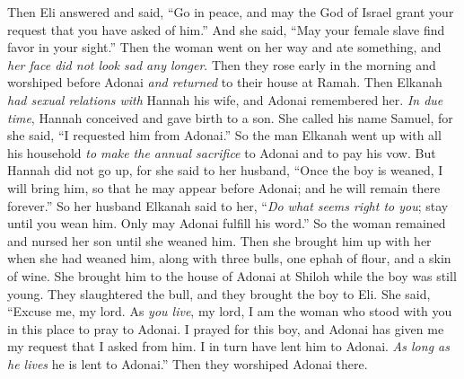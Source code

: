 \begin{biblechapter}
\verse Then Eli answered and said, “Go in peace, and may the God of Israel grant your request that you have asked of him.”
\verse And she said, “May your female slave find favor in your sight.” Then the woman went on her way and ate something, and \textit{her face did not look sad any longer}.
 Then they rose early in the morning and worshiped before Adonai \textit{and returned} to their house at Ramah. Then Elkanah \textit{had sexual relations with} Hannah his wife, and Adonai remembered her.
\verse \textit{In due time}, Hannah conceived and gave birth to a son. She called his name Samuel, for she said, “I requested him from Adonai.”
\verse So the man Elkanah went up with all his household \textit{to make the annual sacrifice} to Adonai and to pay his vow.
\verse But Hannah did not go up, for she said to her husband, “Once the boy is weaned, I will bring him, so that he may appear before Adonai; and he will remain there forever.”
\verse So her husband Elkanah said to her, “\textit{Do what seems right to you}; stay until you wean him. Only may Adonai fulfill his word.” So the woman remained and nursed her son until she weaned him.
\verse Then she brought him up with her when she had weaned him, along with three bulls, one ephah of flour, and a skin of wine. She brought him to the house of Adonai at Shiloh while the boy was still young.
\verse They slaughtered the bull, and they brought the boy to Eli.
\verse She said, “Excuse me, my lord. As \textit{you live}, my lord, I am the woman who stood with you in this place to pray to Adonai.
\verse I prayed for this boy, and Adonai has given me my request that I asked from him.
\verse I in turn have lent him to Adonai. \textit{As long as he lives} he is lent to Adonai.” Then they worshiped Adonai there.
\end{biblechapter}

